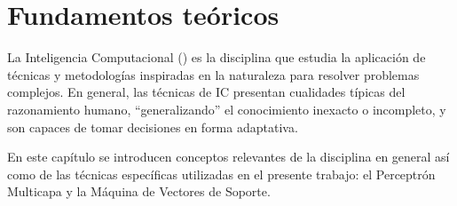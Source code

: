 %
%
%
%
\chapter{Fundamentos teóricos}
%
La Inteligencia Computacional () es la disciplina que estudia la
aplicación de técnicas y metodologías inspiradas en la naturaleza para
resolver problemas complejos. En general, las técnicas de IC presentan
cualidades típicas del razonamiento humano, ``generalizando'' el
conocimiento inexacto o incompleto, y son capaces de tomar decisiones
en forma adaptativa.

En este capítulo se introducen conceptos relevantes de la disciplina
en general así como de las técnicas específicas utilizadas en el
presente trabajo: el Perceptrón Multicapa y la Máquina de Vectores de
Soporte.
